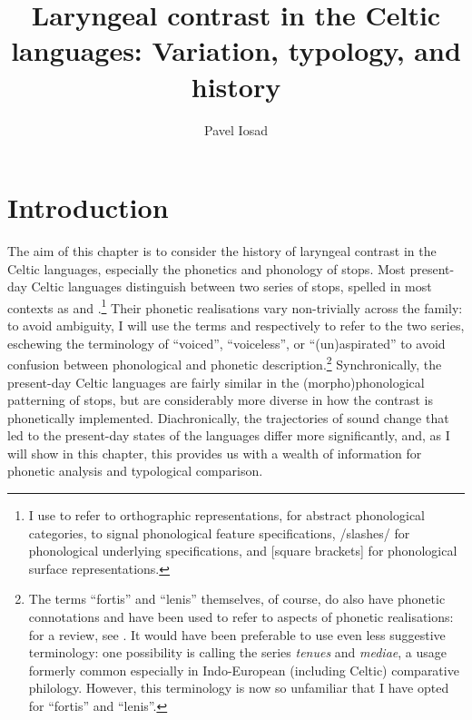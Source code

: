 \documentclass[output=paper,colorlinks,citecolor=brown]{langscibook}
\author{Pavel Iosad\affiliation{University of Edinburgh}}
\title{Laryngeal contrast in the Celtic languages: Variation, typology, and history}
\begin{document}
\maketitle



\section{Introduction}
\label{sec:introduction}

The aim of this chapter is to consider the history of laryngeal contrast in the Celtic languages, especially the phonetics and phonology of stops. Most present\hyp day Celtic languages distinguish between two series of stops, spelled in most contexts as  and .\footnote{I use  to refer to orthographic representations,  for abstract phonological categories,  to signal phonological feature specifications, /slashes/ for phonological underlying specifications, and [square brackets] for phonological surface representations.} Their phonetic realisations vary non\hyp trivially across the family: to avoid ambiguity, I will use the terms  and  respectively to refer to the two series, eschewing the terminology of \enquote{voiced}, \enquote{voiceless}, or \enquote{(un)aspirated} to avoid confusion between phonological and phonetic description.\footnote{The terms \enquote{fortis} and \enquote{lenis} themselves, of course, do also have phonetic connotations and have been used to refer to aspects of phonetic realisations: for a review, see \textcite{honeybone08:_lenit}. It would have been preferable to use even less suggestive terminology: one possibility is calling the  series \emph{tenues} and  \emph{mediae}, a usage formerly common especially in Indo\hyp European (including Celtic) comparative philology. However, this terminology is now so unfamiliar that I have opted for \enquote{fortis} and \enquote{lenis}.} Synchronically, the present\hyp day Celtic languages are fairly similar in the (morpho)phonological patterning of stops, but are considerably more diverse in how the contrast is phonetically implemented. Diachronically, the trajectories of sound change that led to the present\hyp day states of the languages differ more significantly, and, as I will show in this chapter, this provides us with a wealth of information for phonetic analysis and typological comparison.
\end{document}
